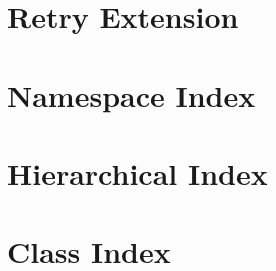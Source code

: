 \let\mypdfximage\pdfximage\def\pdfximage{\immediate\mypdfximage}\documentclass[twoside]{book}
\newcommand{\+}{\discretionary{\mbox{\scriptsize$\hookleftarrow$}}{}{}}
\begin{document}
\chapter{Retry Extension}
\label{md_RingCentral_Net_Retry_README}

\chapter{Namespace Index}

\chapter{Hierarchical Index}

\chapter{Class Index}

\end{document}
